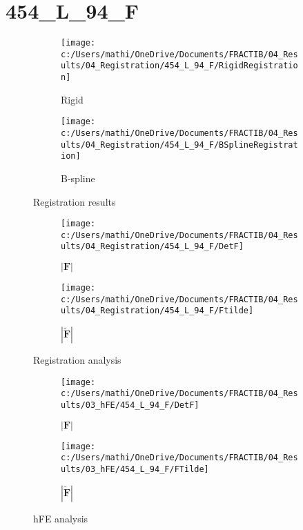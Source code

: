 \documentclass{article}%
\begin{document}
%
\newpage%
\section*{454\_L\_94\_F}%
\label{sec:454L94F}%


\begin{figure}[h!]%
\begin{subfigure}[b]{0.5\linewidth}%
\texttt{[image: c:/Users/mathi/OneDrive/Documents/FRACTIB/04\_Results/04\_Registration/454\_L\_94\_F/RigidRegistration]}%
\caption{Rigid}%
\end{subfigure}%
\begin{subfigure}[b]{0.5\linewidth}%
\texttt{[image: c:/Users/mathi/OneDrive/Documents/FRACTIB/04\_Results/04\_Registration/454\_L\_94\_F/BSplineRegistration]}%
\caption{B{-}spline}%
\end{subfigure}%
\caption{Registration results}%
\end{figure}

%


\begin{figure}[h!]%
\begin{subfigure}[b]{0.5\linewidth}%
\texttt{[image: c:/Users/mathi/OneDrive/Documents/FRACTIB/04\_Results/04\_Registration/454\_L\_94\_F/DetF]}%
\caption{$|\mathbf{F}|$}%
\end{subfigure}%
\begin{subfigure}[b]{0.5\linewidth}%
\texttt{[image: c:/Users/mathi/OneDrive/Documents/FRACTIB/04\_Results/04\_Registration/454\_L\_94\_F/Ftilde]}%
\caption{$|\widetilde{\mathbf{F}}|$}%
\end{subfigure}%
\caption{Registration analysis}%
\end{figure}

%


\begin{figure}[h!]%
\begin{subfigure}[b]{0.5\linewidth}%
\texttt{[image: c:/Users/mathi/OneDrive/Documents/FRACTIB/04\_Results/03\_hFE/454\_L\_94\_F/DetF]}%
\caption{$|\mathbf{F}|$}%
\end{subfigure}%
\begin{subfigure}[b]{0.5\linewidth}%
\texttt{[image: c:/Users/mathi/OneDrive/Documents/FRACTIB/04\_Results/03\_hFE/454\_L\_94\_F/FTilde]}%
\caption{$|\widetilde{\mathbf{F}}|$}%
\end{subfigure}%
\caption{hFE analysis}%
\end{figure}
\end{document}
